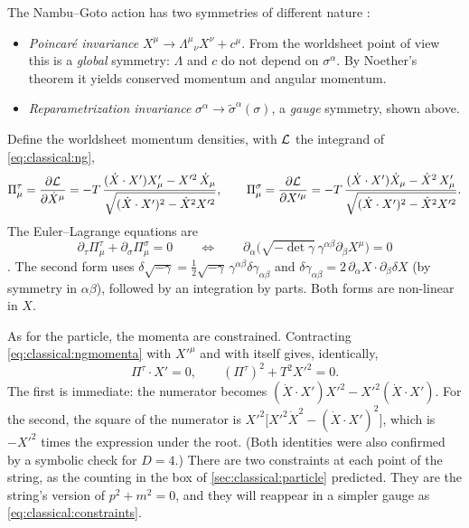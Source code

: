 The Nambu--Goto action has two symmetries of different nature
:
\begin{itemize}[nosep]
\item \emph{Poincar\'e invariance} $X^\mu\to\Lambda^\mu{}_\nu X^\nu+c^\mu$. From the
worldsheet point of view this is a \emph{global} symmetry: $\Lambda$ and $c$ do not depend on
$\sigma^\alpha$. By Noether's theorem it yields conserved momentum and angular momentum.
\item \emph{Reparametrization invariance} $\sigma^\alpha\to\tilde\sigma^\alpha(\sigma)$, a
\emph{gauge} symmetry, shown above.
\end{itemize}
Define the worldsheet momentum densities, with ${\cal L}$ the integrand of
\eqref{eq:classical:ng},
\begin{equation}\label{eq:classical:ngmomenta}
  \Pi^\tau_\mu=\frac{\partial{\cal L}}{\partial\dot X^\mu}
   =-T\,\frac{(\dot X\cdot X')X'_\mu-X'^2\,\dot X_\mu}{\sqrt{(\dot X\cdot X')^2-\dot X^2X'^2}},
  \qquad
  \Pi^\sigma_\mu=\frac{\partial{\cal L}}{\partial X'^\mu}
   =-T\,\frac{(\dot X\cdot X')\dot X_\mu-\dot X^2\,X'_\mu}{\sqrt{(\dot X\cdot X')^2-\dot X^2X'^2}} .
\end{equation}
The Euler--Lagrange equations are
\begin{equation}\label{eq:classical:ngeom}
  \partial_\tau\Pi^\tau_\mu+\partial_\sigma\Pi^\sigma_\mu=0
  \qquad\Longleftrightarrow\qquad
  \partial_\alpha\big(\sqrt{-\det\gamma}\,\gamma^{\alpha\beta}\partial_\beta X^\mu\big)=0
\end{equation}
. The second form uses $\delta\sqrt{-\gamma}=\tfrac12
\sqrt{-\gamma}\,\gamma^{\alpha\beta}\delta\gamma_{\alpha\beta}$ and
$\delta\gamma_{\alpha\beta}=2\,\partial_\alpha X\cdot\partial_\beta\delta X$ (by symmetry in
$\alpha\beta$), followed by an integration by parts. Both forms are non-linear in $X$.

As for the particle, the momenta are constrained. Contracting
\eqref{eq:classical:ngmomenta} with $X'^\mu$ and with itself gives, identically,
\begin{equation}\label{eq:classical:ngconstraints}
  \Pi^\tau\cdot X'=0,\qquad (\Pi^\tau)^2+T^2X'^2=0 .
\end{equation}
The first is immediate: the numerator becomes $(\dot X\cdot X')X'^2-X'^2(\dot X\cdot X')$. For
the second, the square of the numerator is $X'^2\big[X'^2\dot X^2-(\dot X\cdot X')^2\big]$,
which is $-X'^2$ times the expression under the root. (Both identities were also confirmed by
a symbolic check for $D=4$.) There are two constraints at each point of the string, as the
counting in the box of \cref{sec:classical:particle} predicted. They are the
string's version of $p^2+m^2=0$, and they will reappear in a simpler gauge as
\eqref{eq:classical:constraints}.

